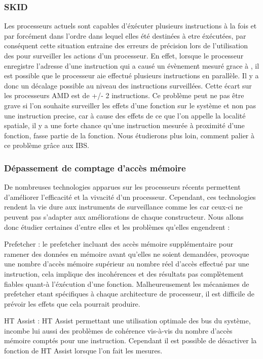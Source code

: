					\subsubsection{SKID}
						Les processeurs actuels sont capables d'éxécuter plusieurs instructions à la fois et par forcément dans l'ordre dans lequel elles été destinées à etre éxécutées, par conséquent cette situation entraine des erreurs de précision lors de l'utilisation des \PMC pour surveiller les actions d'un processeur. En effet, lorsque le processeur enregistre l'adresse d'une instruction qui a causé un évènement mesuré grace à \PMC, il est possible que le processeur aie effectué plusieurs instructions en parallèle. Il y a donc un décalage possible au niveau des instructions surveillées. Cette écart sur les processeurs AMD est de +/- 2 instructions. Ce problème peut ne pas être grave si l'on souhaite surveiller les effets d'une fonction sur le système et non pas une instruction precise, car à cause des effets de ce que l'on appelle la localité spatiale, il y a une forte chance qu'une instruction mesurée à proximité d'une fonction, fasse partie de la fonction. Nous étudierons plus loin, comment palier à ce problème grâce aux IBS.
					\subsubsection{Dépassement de comptage d'accès mémoire}
						De nombreuses technologies apparues sur les processeurs récents permettent d'améliorer l'efficacité et la vivacité d'un processeur. Cependant, ces technologies rendent la vie dure aux instruments de surveillance comme les \PMC car ceux-ci ne peuvent pas s'adapter aux améliorations de chaque constructeur. Nous allons donc étudier certaines d'entre elles et les problèmes qu'elles engendrent : 
						\bitem
							\item{Prefetcher : le prefetcher incluant des accès mémoire supplémentaire pour ramener des données en mémoire avant qu'elles ne soient demandées, provoque une nombre d'accès mémoire supérieur au nombre réel d'accès effectué par une instruction, cela implique des incohérences et des résultats pas complètement fiables quant-à l'éxécution d'une fonction. Malheureusement les mécanismes de prefetcher etant spécifiques à chaque architecture de processeur, il est difficile de prévoir les effets que cela pourrait produire.}
							\item{HT Assist : HT Assist permettant une utilisation optimale des bus du système, incombe lui aussi des problèmes de cohérence vis-à-vis du nombre d'accès mémoire comptés pour une instruction. Cependant il est possible de désactiver la fonction de HT Assist lorsque l'on fait les mesures.}
						\eitem
